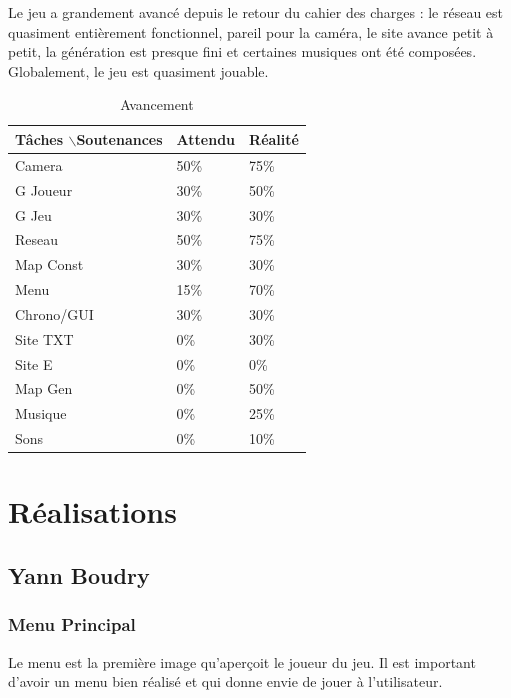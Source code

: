 \documentclass{article}
\begin{document}
Le jeu a grandement avancé depuis le retour du cahier des charges : le réseau est quasiment entièrement fonctionnel, pareil pour la caméra, le site avance petit à petit, la génération est presque fini et certaines musiques ont été composées. Globalement, le jeu est quasiment jouable.
\begin{table}[!h]
\centering
\caption{Avancement}
\begin{tabular}{|l|l|l|}
\hline

Tâches $\backslash$Soutenances & Attendu & Réalité \\ \hline
Camera & 50\% & 75\% \\ \hline
G Joueur & 30\% & 50\% \\ \hline
G Jeu & 30\% & 30\% \\ \hline
Reseau & 50\% & 75\% \\ \hline
Map Const & 30\% & 30\% \\ \hline
Menu & 15\% & 70\% \\ \hline
Chrono/GUI & 30\% & 30\% \\ \hline
Site TXT & 0\% & 30\% \\ \hline
Site E & 0\% & 0\% \\ \hline
Map Gen & 0\% & 50\% \\ \hline
Musique & 0\% & 25\% \\ \hline
Sons & 0\% & 10\% \\ \hline

\end{tabular}
\end{table}
 
\newpage
\section{Réalisations}


\subsection{Yann Boudry}

\subsubsection{Menu Principal}

Le menu est la première image qu'aperçoit le joueur du jeu. Il est important d'avoir un menu bien réalisé et qui donne envie de jouer à l'utilisateur.
\end{document}
